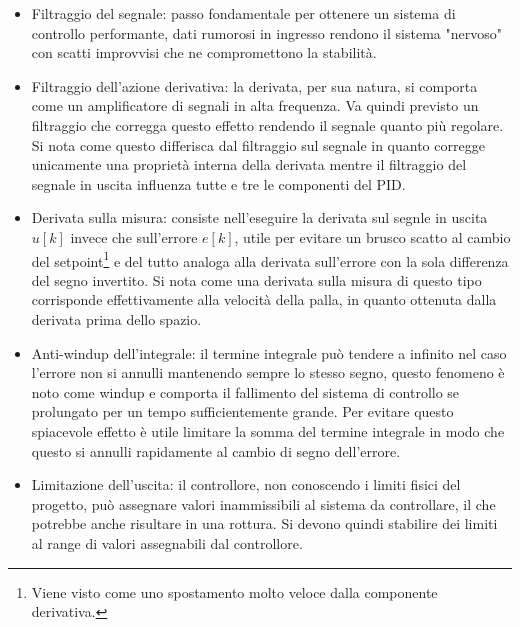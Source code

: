 \documentclass[12pt,twoside,openright]{article}
\begin{document}
\begin{itemize}
\item Filtraggio del segnale: passo fondamentale per ottenere un sistema di controllo performante, dati rumorosi in ingresso rendono il sistema "nervoso" con scatti improvvisi che ne compromettono la stabilità.
\item Filtraggio dell'azione derivativa: la derivata, per sua natura, si comporta come un amplificatore di segnali in alta frequenza. Va quindi previsto un filtraggio che corregga questo effetto rendendo il segnale quanto più regolare. Si nota come questo differisca dal filtraggio sul segnale in quanto corregge unicamente una proprietà interna della derivata mentre il filtraggio del segnale in uscita influenza tutte e tre le componenti del PID. %
\item Derivata sulla misura: consiste nell'eseguire la derivata sul segnle in uscita $u[k]$ invece che sull'errore $e[k]$, utile per evitare un brusco scatto al cambio del setpoint\footnote{Viene visto come uno spostamento molto veloce dalla componente derivativa.} e del tutto analoga alla derivata sull'errore con la sola differenza del segno invertito. Si nota come una derivata sulla misura di questo tipo corrisponde effettivamente alla velocità della palla, in quanto ottenuta dalla derivata prima dello spazio.
\item Anti-windup dell'integrale: il termine integrale può tendere a infinito nel caso l'errore non si annulli mantenendo sempre lo stesso segno, questo fenomeno è noto come windup e comporta il fallimento del sistema di controllo se prolungato per un tempo sufficientemente grande. Per evitare questo spiacevole effetto è utile limitare la somma del termine integrale in modo che questo si annulli rapidamente al cambio di segno dell'errore.
\item Limitazione dell'uscita: il controllore, non conoscendo i limiti fisici del progetto, può assegnare valori inammissibili al sistema da controllare, il che potrebbe anche risultare in una rottura. Si devono quindi stabilire dei limiti al range di valori assegnabili dal controllore.
\end{itemize}
\end{document}
